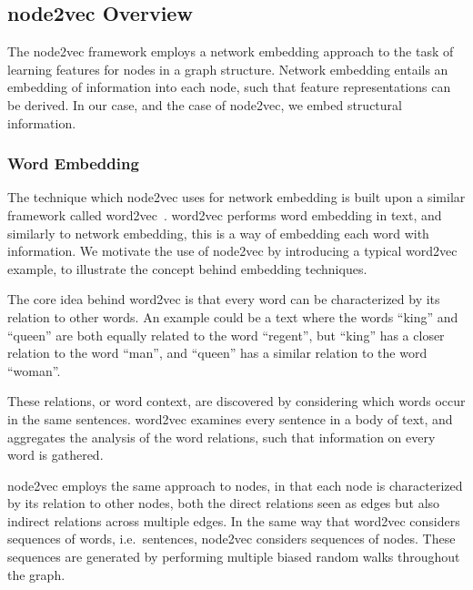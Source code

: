 \subsection{node2vec Overview}\label{sec:node2vec}
The node2vec framework employs a network embedding approach to the task of learning features for nodes in a graph structure. Network embedding entails an embedding of information into each node, such that feature representations can be derived. In our case, and the case of node2vec, we embed structural information.

\subsubsection{Word Embedding}
The technique which node2vec uses for network embedding is built upon a similar framework called word2vec~\cite{word2vec}. word2vec performs word embedding in text, and similarly to network embedding, this is a way of embedding each word with information. We motivate the use of node2vec by introducing a typical word2vec example, to illustrate the concept behind embedding techniques.

The core idea behind word2vec is that every word can be characterized by its relation to other words. An example could be a text where the words \enquote{king} and \enquote{queen} are both equally related to the word \enquote{regent}, but \enquote{king} has a closer relation to the word \enquote{man}, and \enquote{queen} has a similar relation to the word \enquote{woman}.

These relations, or word context, are discovered by considering which words occur in the same sentences. word2vec examines every sentence in a body of text, and aggregates the analysis of the word relations, such that information on every word is gathered.

node2vec employs the same approach to nodes, in that each node is characterized by its relation to other nodes, both the direct relations seen as edges but also indirect relations across multiple edges.
In the same way that word2vec considers sequences of words, i.e.\ sentences, node2vec considers sequences of nodes. These sequences are generated by performing multiple biased random walks throughout the graph.

